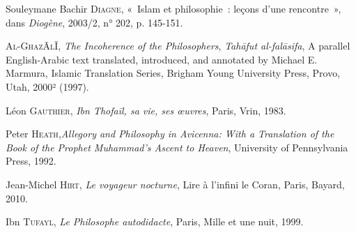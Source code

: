 Souleymane Bachir \textsc{Diagne}, «~Islam et philosophie~: leçons d'une
rencontre~», dans \emph{Diogène}, 2003/2, n° 202, p. 145-151.

A\textsc{l-Ghaz}Ā\textsc{l}Ī, \emph{The Incoherence of the
Philosophers}, \emph{Tahāfut al-falāsifa}, A parallel English-Arabic
text translated, introduced, and annotated by Michael E. Marmura,
Islamic Translation Series, Brigham Young University Press, Provo, Utah,
2000² (1997).

Léon \textsc{Gauthier}, \emph{Ibn Thofaīl, sa vie, ses œuvres}, Paris,
Vrin, 1983.

Peter \textsc{Heath},\emph{Allegory
and Philosophy in Avicenna: With a Translation of the Book of the
Prophet Muhammad's Ascent to Heaven}, University of Pennsylvania Press,
1992.

Jean-Michel \textsc{Hirt}, \emph{Le voyageur nocturne}, Lire à l'infini
le Coran, Paris, Bayard, 2010.

Ibn \textsc{Tufayl}, \emph{Le Philosophe autodidacte}, Paris, Mille et
une nuit, 1999.
